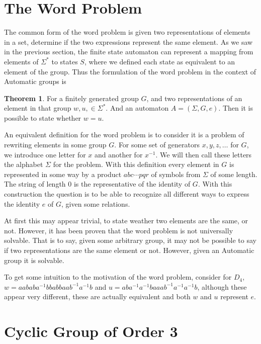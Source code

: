 \documentclass[10pt]{amsart}
\theoremstyle{definition}
\newtheorem{theorem}{Theorem}[section]
\begin{document}
\section{The Word Problem}\label{sec:the_word_problem}

The common form of the word problem is given two representations of elements in
a set, determine if the two expressions represent the same element. As we saw
in the previous section, the finite state automaton can represent a mapping
from elements of $\Sigma^*$ to states $S$, where we defined each state as
equivalent to an element of the group. Thus the formulation of the word problem
in the context of Automatic groups is

\begin{theorem}\label{thm:twp}
  For a finitely generated group $G$, and two representations of an element in
  that group $w,u,\in\Sigma^*$. And an automaton $A=\left(\Sigma,G,e\right)$.
  Then it is possible to state whether $w=u$.
\end{theorem}

An equivalent definition for the word problem is to consider it is a problem of
rewriting elements in some group $G$. For some set of generators $x, y,
z,\ldots$ for $G$, we introduce one letter for $x$ and another for $x^{-1}$. We
will then call these letters the alphabet $\Sigma$ for the problem. With this
definition every element in $G$ is represented in some way by a product
$abc\cdots pqr$ of symbols from $\Sigma$ of some length. The string of length
$0$ is the representative of the identity of $G$. With this construction the
question is to be able to recognize all different ways to express the identity
$e$ of $G$, given some relations.

At first this may appear trivial, to state weather two elements are the same,
or not. However, it has been proven that the word problem is not universally
solvable. That is to say, given some arbitrary group, it may not be possible to
say if two representations are the same element or not. However, given an
Automatic group it is solvable.

To get some intuition to the motivation of the word problem, consider for
$D_4$, $w=aababa^{-1}bbabbaab^{-1}a^{-1}b$ and
$u=aba^{-1}a^{-1}baaab^{-1}a^{-1}a^{-1}b$, although these appear very
different, these are actually equivalent and both $w$ and $u$ represent $e$.

\section{Cyclic Group of Order 3}%
\label{sec:cyclic_group_of_order_3}
\end{document}
